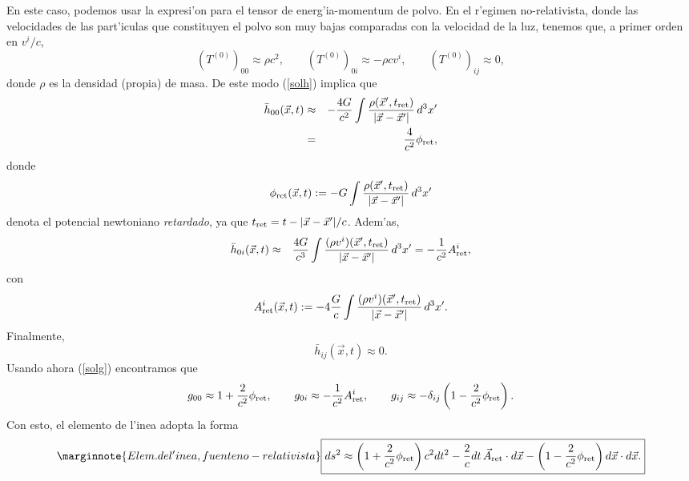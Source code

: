 En este caso, podemos usar la expresi'on para el tensor de energ'ia-momentum de
polvo. En el r'egimen no-relativista, donde las velocidades de las part'iculas
que constituyen el polvo son muy bajas comparadas con la velocidad de la luz,
tenemos que, a primer orden en $v^i/c$,
\begin{equation}\label{Tem0norel}
(T^{(0)})_{00}\approx \rho c^2, \qquad (T^{(0)})_{0i}\approx -\rho cv^i, \qquad (T^{(0)})_{ij}\approx 0,
\end{equation}
donde $\rho$ es la densidad (propia) de masa. De este modo (\ref{solh}) implica que
\begin{eqnarray}
\bar{h}_{00}(\vec{x},t)&\approx&-\frac{4G}{c^2}\int\frac{\rho(\vec{x}',t_{\rm ret})}{\left|\vec{x}-\vec{x}'\right|}\, d^3x' \\
&=&\frac{4}{c^2}\phi_{\rm ret}, \label{hbar00}
\end{eqnarray}
donde
\begin{equation}\label{defphii}
 \phi_{\rm ret}(\vec{x},t):=-G\int\frac{\rho(\vec{x}',t_{\rm ret})}{\left|\vec{x}-\vec{x}'\right|}\, d^3x'
\end{equation}
denota el potencial newtoniano \textit{retardado}, ya que $t_{\rm ret}=t-|\vec{x}-\vec{x}'|/c$. Adem'as, 
\begin{eqnarray}
\bar{h}_{0i}(\vec{x},t)&\approx& \frac{4G}{c^3}\int\frac{(\rho v^i)(\vec{x}',t_{\rm ret})}{\left|\vec{x}-\vec{x}'\right|}\, d^3x' =-\frac{1}{c^2}A^i_{\rm ret}, \label{hbar0i}
\end{eqnarray}
con
\begin{equation}\label{defAret}
 A^i_{\rm ret}(\vec{x},t):=-4\frac{G}{c}\int\frac{(\rho v^i)(\vec{x}',t_{\rm ret})}{\left|\vec{x}-\vec{x}'\right|}\, d^3x' .
\end{equation}
Finalmente,
\begin{equation}
\bar{h}_{ij}(\vec{x},t)\approx 0.
\end{equation}
Usando ahora (\ref{solg}) encontramos que
\begin{equation}\label{gphiA}
 g_{00}\approx 1+\frac{2}{c^2}\phi_{\rm ret}, \qquad g_{0i}\approx -\frac{1}{c^2}A^i_{\rm ret}, \qquad
g_{ij}\approx -\delta_{ij}\left(1-\frac{2}{c^2}\phi_{\rm ret}\right).
\end{equation}
Con esto, el elemento de l'inea adopta la forma
\begin{equation}\label{ds2phiA}\marginnote{Elem. de l'inea, fuente no-relativista}
\boxed{ds^2\approx \left(1+\frac{2}{c^2}\phi_{\rm
ret}\right)c^2dt^2-\frac{2}{c}dt\,\vec{A}_{\rm ret}\cdot d\vec{x}-\left(1-\frac{2}{c^2}\phi_{\rm ret}\right)d\vec{x}\cdot d\vec{x}.}
\end{equation}

